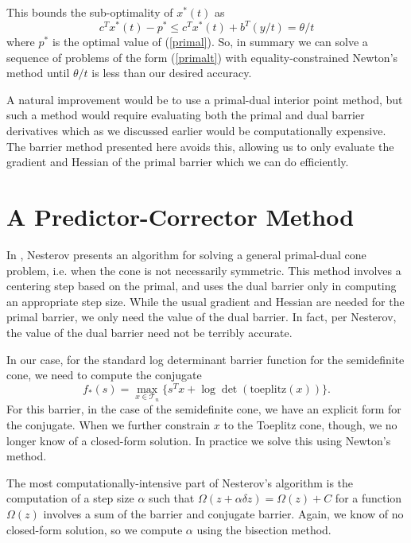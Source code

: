 \documentclass{article}
\begin{document}
This bounds the sub-optimality of $x^*(t)$ as
\[
  c^Tx^*(t) - p^* \leq c^Tx^*(t) + b^T(y/t) = \theta/t 
\]
where $p^*$ is the optimal value of (\ref{primal}). So, in summary we can solve a sequence of 
problems of the form (\ref{primalt}) with equality-constrained Newton's
method until $\theta/t$ is less than our desired accuracy. 

A natural improvement would be to use a primal-dual interior point method,
but such a method would require evaluating both the primal and dual barrier derivatives
which as we discussed earlier would be computationally expensive. The barrier method
presented here avoids this, allowing us to only evaluate the gradient and Hessian of the
primal barrier which we can do efficiently.

\section{A Predictor-Corrector Method}
In \cite{nesterov2006towards}, Nesterov presents an algorithm for solving a general
primal-dual cone problem, i.e. when the cone is not necessarily symmetric. This
method involves a centering step based on the primal, and uses the dual barrier
only in computing an appropriate step size. While the usual gradient and
Hessian are needed for the primal barrier, we only need the value of the dual
barrier. In fact, per Nesterov, the value of the dual barrier need not be terribly accurate.

In our case, for the standard log determinant barrier function for the semidefinite cone, we need to compute the conjugate
\begin{equation}
f_*(s) = \max_{x \in \mathcal T_n} \{ s^T x + \log\det(\text{toeplitz}(x))\}.
\end{equation}
For this barrier, in the case of the semidefinite cone, we have an explicit
form for the conjugate. When we further constrain $x$ to the Toeplitz cone,
though, we no longer know of a closed-form solution. In practice we solve this
using Newton's method.

The most computationally-intensive part of Nesterov's algorithm is the
computation of a step size $\alpha$ such that $\Omega(z + \alpha \delta z) =
\Omega(z) + C$ for a function $\Omega(z)$ involves a sum of the barrier and
conjugate barrier. Again, we know of no closed-form solution, so we compute
$\alpha$ using the bisection method.
\end{document}
